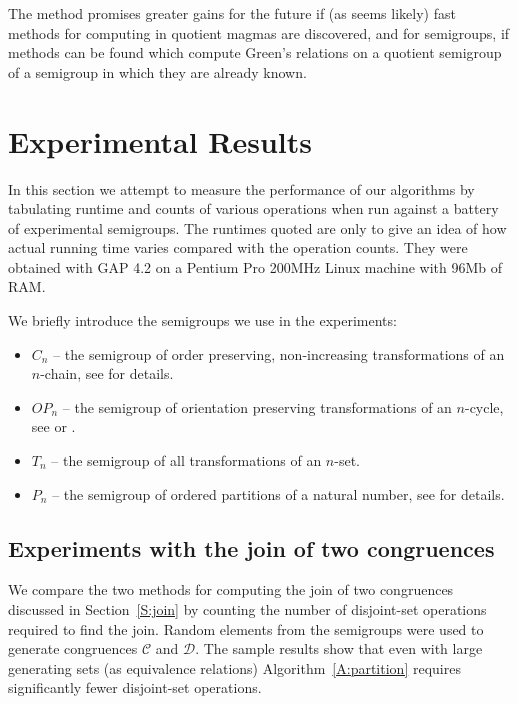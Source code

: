 \documentclass{acmconf}
\def\gap{\sf GAP}
\begin{document}
The method promises greater gains for the future
if (as seems likely) fast methods for computing 
in quotient magmas are discovered, and for semigroups,
if methods can be found which compute Green's
relations on a quotient semigroup of a semigroup in which they are
already known.

\section{Experimental Results} \label{s:experiment}
In this section we attempt to measure the performance of our algorithms
by tabulating runtime and counts of various operations
when run against a battery of experimental semigroups. 
The runtimes quoted are only to give an idea of how actual running
time varies compared with the operation counts. They were obtained
with {\gap} 4.2 on a Pentium Pro 200MHz Linux machine with 96Mb of RAM.

We briefly introduce the semigroups we use in the experiments:
\begin{itemize}
\item $C_n$ -- the semigroup of order preserving, non-increasing
transformations of an $n$-chain, see \cite{pSol96} for details.
\item $OP_n$ -- the semigroup of orientation preserving transformations
of an $n$-cycle, see \cite{pArth99} or \cite{pHigg99}.
\item $T_n$ -- the semigroup of all transformations of an $n$-set.
\item $P_n$ -- the semigroup of ordered partitions of a natural
number, see \cite{tgl94} for details.
\end{itemize}

\subsection{Experiments with the join of two congruences}
We compare the two methods for computing the join of two congruences 
discussed in Section~\ref{S:join}
by counting the number of disjoint-set operations required to 
find the join. 
Random elements from the semigroups were used to generate congruences
$\mathcal C$ and $\mathcal D$. 
The sample results show that even with 
large generating sets (as equivalence relations) 
Algorithm~\ref{A:partition} requires significantly fewer 
disjoint-set operations.   
\end{document}
